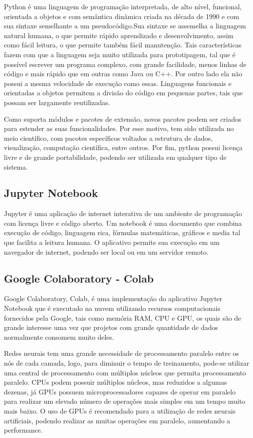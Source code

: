\documentclass[
	12pt,				%
	oneside,			%
	a4paper,			%
	english,			%
	brazil				%
	]{abntex2}
\begin{document}
Python é uma linguagem de programação interpretada, de alto nível, funcional, orientada a objetos e com semântica dinâmica criada na década de 1990 e com sua sintaxe semelhante a um pseudocódigo.Sua sintaxe se assemelha a linguagem natural humana, o que permite rápido aprendizado e desenvolvimento, assim como fácil leitura, o que permite também fácil manutenção. Tais características fazem com que a linguagem seja muito utilizada para prototipagem, tal que é possível escrever um programa complexo, com grande facilidade, menos linhas de código e mais rápido que em outras como Java ou C++. Por outro lado ela não possui a mesma velocidade de execução como essas. Linguagens funcionais e orientadas a objetos permitem a divisão do código em pequenas partes, tais que possam ser largamente reutilizadas.
 
Como suporta módulos e pacotes de extensão, novos pacotes podem ser criados para estender as suas funcionalidades. Por esse motivo, tem sido utilizada no meio científico, com pacotes específicos voltados a estrutura de dados, visualização, computação científica, entre outros. Por fim, python possui licença livre e de grande portabilidade, podendo ser utilizada em qualquer tipo de sistema. 

\subsection{Jupyter Notebook}
Jupyter é uma aplicação de internet interativa de um ambiente de programação com licença livre e código aberto. Um notebook é uma documento que combina execução de código, linguagem rica, fórmulas matemáticas, gráficos e media tal que facilita a leitura humana. O aplicativo permite sua execução em um navegador de internet, podendo ser local ou em um servidor remoto. 

\subsection{Google Colaboratory - Colab}
Google Colaboratory, Colab, é uma implementação do aplicativo Jupyter Notebook que é executado na nuvem utilizando recursos computacionais fornecidos pela Google, tais como memória RAM, CPU e GPU, os quais são de grande interesse uma vez que projetos com grande quantidade de dados normalmente consomem muito deles.

Redes neurais tem uma grande necessidade de processamento paralelo entre os nós de cada camada, logo, para diminuir o tempo de treinamento, pode-se utilizar uma central de processamento com múltiplos núcleos que permita processamento paralelo. CPUs podem possuir múltiplos núcleos, mas reduzidos a algumas dezenas, já GPUs possuem microprocessadores capazes de operar em paralelo para realizar um elevado número de operações mais simples em um tempo muito mais baixo. O uso de GPUs é recomendado para a utilização de redes neurais artificiais, podendo realizar as muitas operações em paralelo, aumentando a performance. 
 
\end{document}
